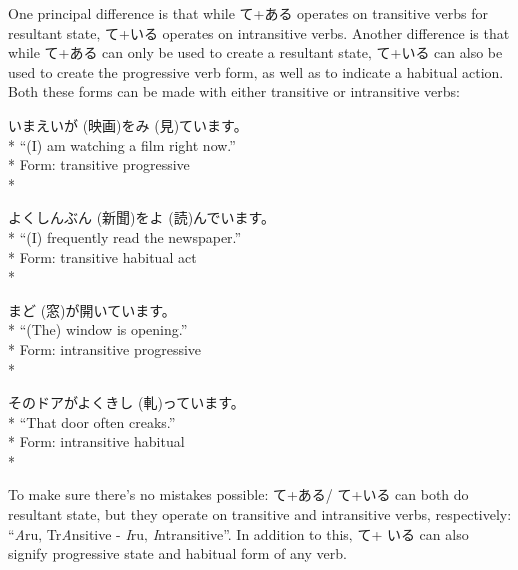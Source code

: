 \documentclass[11pt, b5paper, twoside, openright, onecolumn]{book}
\makeatletter
\newcommand*{\rubystack}[2]{{\relscale{0.5}%
  \begin{tabular}[b]{@{}c@{}}%
    {#1}\\%
   {\textscale{2}{#2}}%
  \end{tabular}}%
}
\DeclareRobustCommand*{\ruby}[2]{%
  \mbox{%
    \setlength{\parskip}{0ex}%
    \BeginAccSupp{method=pdfstringdef,ActualText={#1}}%
      \rubystack{\phantom{#2}}{#1}%
      \llap{%
        \rubystack{#2}{\phantom{#1}}%
      }%
    \EndAccSupp{}%
  }%
}
\renewcommand*{\ruby}[2]{#2 (#1)}%
\newenvironment{exampleblock}{
\setlength{\parindent}{0.6in}
\begin{minipage}[t]{\dimexpr\textwidth-\parindent}}
{\end{minipage}}
\makeatother
\begin{document}
One principal difference is that while て+ある operates on transitive verbs for resultant state‚ て+いる operates on intransitive verbs. Another difference is that while て+ある can only be used to create a resultant state‚ て+いる can also be used to create the progressive verb form‚ as well as to indicate a habitual action. Both these forms can be made with either transitive or intransitive verbs:

\vspace{0.4cm}
\begin{exampleblock}
いま\ruby{映画}{えいが}を\ruby{見}{み}ています。 \\* 
“(I) am watching a film right now.” \\* 
Form: transitive progressive \\* 
\end{exampleblock}
\vspace{0.2cm}

\begin{exampleblock}
よく\ruby{新聞}{しんぶん}を\ruby{読}{よ}んでいます。 \\* 
“(I) frequently read the newspaper.” \\* 
Form: transitive habitual act \\* 
\end{exampleblock}
\vspace{0.2cm}

\begin{exampleblock}
\ruby{窓}{まど}が開いています。 \\* 
“(The) window is opening.” \\* 
Form: intransitive progressive \\* 
\end{exampleblock}
\vspace{0.2cm}

\begin{exampleblock}
そのドアがよく\ruby{軋}{きし}っています。 \\* 
“That door often creaks.” \\* 
Form: intransitive habitual \\* 
\end{exampleblock}
\vspace{0.2cm}

To make sure there’s no mistakes possible: て+ある/ て+いる can both do resultant state‚ but they operate on transitive and intransitive verbs‚ respectively: “\textit{A}ru‚ Tr\textit{A}nsitive - \textit{I}ru‚ \textit{I}ntransitive”. In addition to this‚ て+ いる can also signify progressive state and habitual form of any verb.
\end{document}
